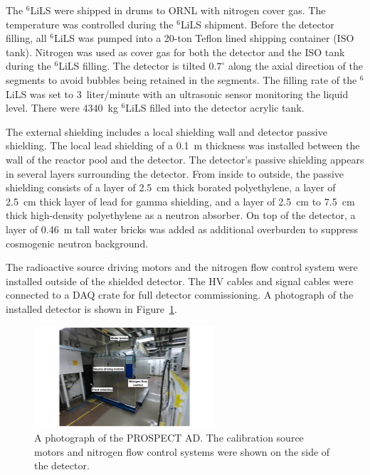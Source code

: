 The $^6$LiLS were shipped in drums to ORNL with nitrogen cover gas.
The temperature was controlled during the $^6$LiLS shipment.
Before the detector filling, all $^6$LiLS was pumped into a 20-ton Teflon lined shipping container (ISO tank). 
Nitrogen was used as cover gas for both the detector and the ISO tank during the $^6$LiLS filling.
The detector is tilted $0.7^\circ$ along the axial direction of the segments to avoid bubbles being retained in the segments.
The filling rate of the $^6$LiLS was set to 3~liter/minute with an ultrasonic sensor monitoring the liquid level.
There were 4340~kg $^6$LiLS filled into the detector acrylic tank.

The external shielding includes a local shielding wall and detector passive shielding. 
The local lead shielding of a 0.1~m thickness was installed between the wall of the reactor pool and the detector.
The detector's passive shielding appears in several layers surrounding the detector.
From inside to outside, the passive shielding consists of a layer of 2.5~cm thick borated polyethylene, a layer of 2.5~cm thick layer of lead for gamma shielding, and a layer of 2.5~cm to 7.5~cm thick high-density polyethylene as a neutron absorber. 
On top of the detector, a layer of 0.46~m tall water bricks was added as additional overburden to suppress cosmogenic neutron background.

The radioactive source driving motors and the nitrogen flow control system were installed outside of the shielded detector. 
The HV cables and signal cables were connected to a DAQ crate for full detector commissioning.
A photograph of the installed detector is shown in Figure~\ref{fig:finish}.

\begin{figure}[h!]
\centering
\includegraphics[width=0.6\textwidth]{Figures/AssembledDetector.pdf}\quad
\caption[The installed PROSPECT AD]{
A photograph of the PROSPECT AD. 
The calibration source motors and nitrogen flow control systems were shown on the side of the detector.}
\label{fig:finish}
\end{figure}

